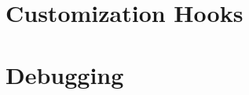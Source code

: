 \documentclass[a4paper,10pt,twoside]{book}
\begin{document}
\section{Customization Hooks}


\section{Debugging}




\ifx\wholebook\relax\else
   
   
\end{document}
